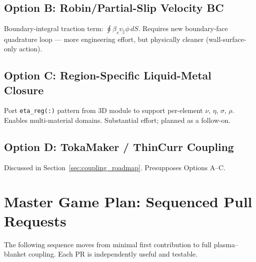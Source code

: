 \documentclass[11pt,letterpaper]{article}
\begin{document}
\subsection{Option B: Robin/Partial-Slip Velocity BC}

Boundary-integral traction term: $\oint \beta_s v_\parallel \phi \,dS$.
Requires new boundary-face quadrature loop --- more engineering effort, but
physically cleaner (wall-surface-only action).

\subsection{Option C: Region-Specific Liquid-Metal Closure}

Port \texttt{eta\_reg(:)} pattern from 3D module to support per-element
$\nu$, $\eta$, $\sigma$, $\rho$.  Enables multi-material domains.
Substantial effort; planned as a follow-on.

\subsection{Option D: TokaMaker / ThinCurr Coupling}

Discussed in Section~\ref{sec:coupling_roadmap}.  Presupposes Options A--C.

\section{Master Game Plan: Sequenced Pull Requests}
\label{sec:gameplan}

The following sequence moves from minimal first contribution to full
plasma--blanket coupling.  Each PR is independently useful and testable.
\end{document}
